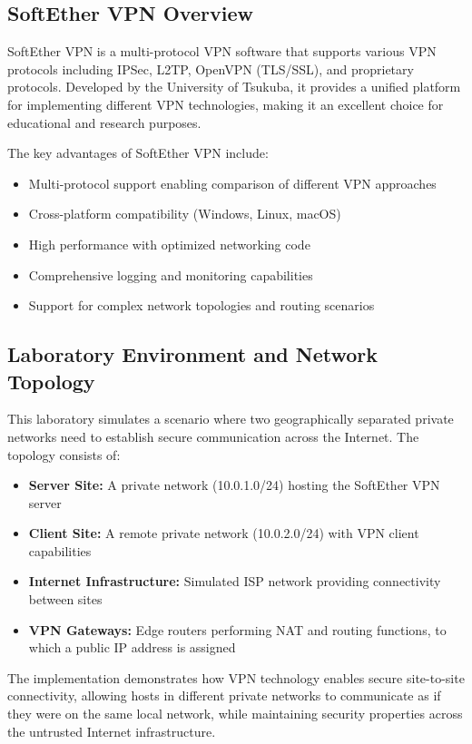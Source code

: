 \subsection{SoftEther VPN Overview}

SoftEther VPN is a multi-protocol VPN software that supports various VPN protocols including IPSec, L2TP, OpenVPN (TLS/SSL), and proprietary protocols. Developed by the University of Tsukuba, it provides a unified platform for implementing different VPN technologies, making it an excellent choice for educational and research purposes.

\noindent
The key advantages of SoftEther VPN include:
\begin{itemize}
    \item Multi-protocol support enabling comparison of different VPN approaches
    \item Cross-platform compatibility (Windows, Linux, macOS)
    \item High performance with optimized networking code
    \item Comprehensive logging and monitoring capabilities
    \item Support for complex network topologies and routing scenarios
\end{itemize}

\subsection{Laboratory Environment and Network Topology}

This laboratory simulates a scenario where two geographically separated private networks need to establish secure communication across the Internet. The topology consists of:

\begin{itemize}
    \item \textbf{Server Site:} A private network (10.0.1.0/24) hosting the SoftEther VPN server
    \item \textbf{Client Site:} A remote private network (10.0.2.0/24) with VPN client capabilities
    \item \textbf{Internet Infrastructure:} Simulated ISP network providing connectivity between sites
    \item \textbf{VPN Gateways:} Edge routers performing NAT and routing functions, to which a public IP address is assigned
\end{itemize}

The implementation demonstrates how VPN technology enables secure site-to-site connectivity, allowing hosts in different private networks to communicate as if they were on the same local network, while maintaining security properties across the untrusted Internet infrastructure.

